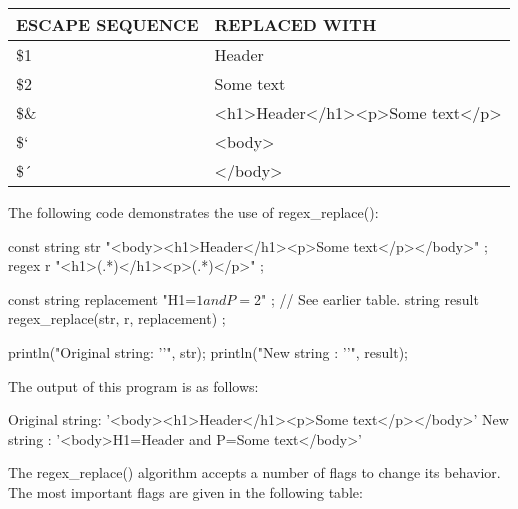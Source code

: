 \begin{longtable}{|l|l|}
\hline
\textbf{ESCAPE SEQUENCE} & \textbf{REPLACED WITH}         \\ \hline
\endfirsthead
%
\endhead
%
\$1                      & Header                         \\ \hline
\$2                      & Some text                      \\ \hline
\$\& & \textless{}h1\textgreater{}Header\textless{}/h1\textgreater{}\textless{}p\textgreater{}Some text\textless{}/p\textgreater{} \\ \hline
\$`                      & \textless{}body\textgreater{}  \\ \hline
\$´                      & \textless{}/body\textgreater{} \\ \hline
\end{longtable}

The following code demonstrates the use of regex\_replace():

\begin{cpp}
const string str { "<body><h1>Header</h1><p>Some text</p></body>" };
regex r { "<h1>(.*)</h1><p>(.*)</p>" };

const string replacement { "H1=$1 and P=$2" }; // See earlier table.
string result { regex_replace(str, r, replacement) };

println("Original string: '{}'", str);
println("New string : '{}'", result);
\end{cpp}

The output of this program is as follows:

\begin{shell}
Original string: '<body><h1>Header</h1><p>Some text</p></body>'
New string     : '<body>H1=Header and P=Some text</body>'
\end{shell}

The regex\_replace() algorithm accepts a number of flags to change its behavior. The most important flags are given in the following table:

